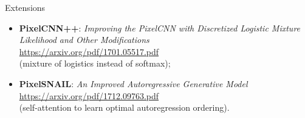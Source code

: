 \begin{frame}{Extensions}
\begin{itemize}
	\item \textbf{PixelCNN++}: \textit{Improving the PixelCNN with Discretized Logistic Mixture Likelihood and Other Modifications} \\
	\href{https://arxiv.org/pdf/1701.05517.pdf}{https://arxiv.org/pdf/1701.05517.pdf} \\
	(mixture of logistics instead of softmax);
	\item \textbf{PixelSNAIL}: \textit{An Improved Autoregressive Generative Model} \\
	\href{https://arxiv.org/pdf/1712.09763.pdf}{https://arxiv.org/pdf/1712.09763.pdf} \\
	(self-attention to learn optimal autoregression ordering).
\end{itemize}
\end{frame}
